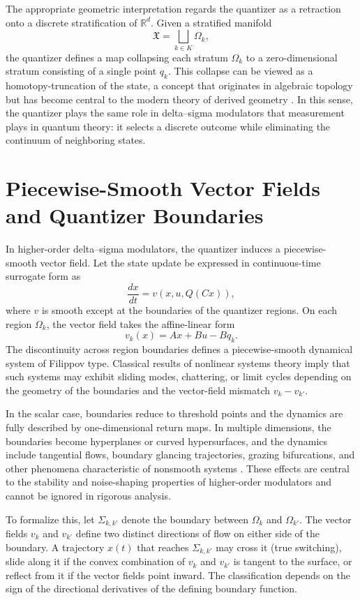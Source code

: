 The appropriate geometric interpretation regards the quantizer as a retraction onto a discrete stratification of $\mathbb{R}^{d}$. Given a stratified manifold
\[
\mathfrak{X} = \bigsqcup_{k \in K} \Omega_k,
\]
the quantizer defines a map collapsing each stratum $\Omega_k$ to a zero-dimensional stratum consisting of a single point $q_k$. This collapse can be viewed as a homotopy-truncation of the state, a concept that originates in algebraic topology but has become central to the modern theory of derived geometry \parencite{Lurie2009Topos}. In this sense, the quantizer plays the same role in delta--sigma modulators that measurement plays in quantum theory: it selects a discrete outcome while eliminating the continuum of neighboring states.

\section{Piecewise-Smooth Vector Fields and Quantizer Boundaries}

In higher-order delta--sigma modulators, the quantizer induces a piecewise-smooth vector field. Let the state update be expressed in continuous-time surrogate form as
\[
\frac{dx}{dt} = v(x,u,Q(Cx)),
\]
where $v$ is smooth except at the boundaries of the quantizer regions. On each region $\Omega_k$, the vector field takes the affine-linear form
\[
v_k(x) = A x + B u - B q_k.
\]
The discontinuity across region boundaries defines a piecewise-smooth dynamical system of Filippov type. Classical results of nonlinear systems theory \parencite{Khalil2002Nonlinear,SlotineLi1991NonlinearControl,Vidyasagar1993NonlinearSystems} imply that such systems may exhibit sliding modes, chattering, or limit cycles depending on the geometry of the boundaries and the vector-field mismatch $v_k - v_{k'}$.

In the scalar case, boundaries reduce to threshold points and the dynamics are fully described by one-dimensional return maps. In multiple dimensions, the boundaries become hyperplanes or curved hypersurfaces, and the dynamics include tangential flows, boundary glancing trajectories, grazing bifurcations, and other phenomena characteristic of nonsmooth systems \parencite{Strogatz1994,Arnold1989MathematicalMethods}. These effects are central to the stability and noise-shaping properties of higher-order modulators and cannot be ignored in rigorous analysis.

To formalize this, let $\Sigma_{k,k'}$ denote the boundary between $\Omega_k$ and $\Omega_{k'}$. The vector fields $v_k$ and $v_{k'}$ define two distinct directions of flow on either side of the boundary. A trajectory $x(t)$ that reaches $\Sigma_{k,k'}$ may cross it (true switching), slide along it if the convex combination of $v_k$ and $v_{k'}$ is tangent to the surface, or reflect from it if the vector fields point inward. The classification depends on the sign of the directional derivatives of the defining boundary function.

